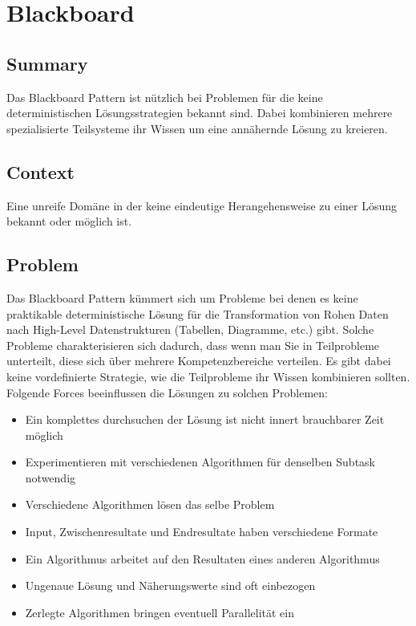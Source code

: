 \chapter{Blackboard}

\section{Summary}
Das Blackboard Pattern ist nützlich bei Problemen für die keine deterministischen Lösungsstrategien bekannt sind. Dabei kombinieren mehrere spezialisierte Teilsysteme ihr Wissen um eine annähernde Lösung zu kreieren. 
\section{Context}
Eine unreife Domäne in der keine eindeutige Herangehensweise zu einer Lösung bekannt oder möglich ist.

\section{Problem}
Das Blackboard Pattern kümmert sich um Probleme bei denen es keine praktikable deterministische Lösung für die Transformation von Rohen Daten nach High-Level Datenstrukturen (Tabellen, Diagramme, etc.) gibt. Solche Probleme charakterisieren sich dadurch, dass wenn man Sie in Teilprobleme unterteilt, diese sich über mehrere Kompetenzbereiche verteilen. Es gibt dabei keine vordefinierte Strategie, wie die Teilprobleme ihr Wissen kombinieren sollten.\\
Folgende Forces beeinflussen die Lösungen zu solchen Problemen:
\begin{itemize}
	\item Ein komplettes durchsuchen der Lösung ist nicht innert brauchbarer Zeit möglich
	\item Experimentieren mit verschiedenen Algorithmen für denselben Subtask notwendig
	\item Verschiedene Algorithmen lösen das selbe Problem
	\item Input, Zwischenresultate und Endresultate haben verschiedene Formate
	\item Ein Algorithmus arbeitet auf den Resultaten eines anderen Algorithmus
	\item Ungenaue Lösung und Näherungswerte sind oft einbezogen
	\item Zerlegte Algorithmen bringen eventuell Parallelität ein 
\end{itemize}

